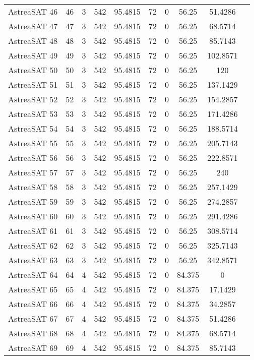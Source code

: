 \begin{longtable}{| c | c | c | c | c | c | c | c | c | c |}
AstreaSAT 46 & 46 & 3 & 542 & 95.4815 & 72 & 0 & 56.25 & 51.4286 \\ 
AstreaSAT 47 & 47 & 3 & 542 & 95.4815 & 72 & 0 & 56.25 & 68.5714 \\ 
AstreaSAT 48 & 48 & 3 & 542 & 95.4815 & 72 & 0 & 56.25 & 85.7143 \\ 
AstreaSAT 49 & 49 & 3 & 542 & 95.4815 & 72 & 0 & 56.25 & 102.8571 \\ 
AstreaSAT 50 & 50 & 3 & 542 & 95.4815 & 72 & 0 & 56.25 & 120 \\ 
AstreaSAT 51 & 51 & 3 & 542 & 95.4815 & 72 & 0 & 56.25 & 137.1429 \\ 
AstreaSAT 52 & 52 & 3 & 542 & 95.4815 & 72 & 0 & 56.25 & 154.2857 \\ 
AstreaSAT 53 & 53 & 3 & 542 & 95.4815 & 72 & 0 & 56.25 & 171.4286 \\ 
AstreaSAT 54 & 54 & 3 & 542 & 95.4815 & 72 & 0 & 56.25 & 188.5714 \\ 
AstreaSAT 55 & 55 & 3 & 542 & 95.4815 & 72 & 0 & 56.25 & 205.7143 \\ 
AstreaSAT 56 & 56 & 3 & 542 & 95.4815 & 72 & 0 & 56.25 & 222.8571 \\ 
AstreaSAT 57 & 57 & 3 & 542 & 95.4815 & 72 & 0 & 56.25 & 240 \\ 
AstreaSAT 58 & 58 & 3 & 542 & 95.4815 & 72 & 0 & 56.25 & 257.1429 \\ 
AstreaSAT 59 & 59 & 3 & 542 & 95.4815 & 72 & 0 & 56.25 & 274.2857 \\ 
AstreaSAT 60 & 60 & 3 & 542 & 95.4815 & 72 & 0 & 56.25 & 291.4286 \\ 
AstreaSAT 61 & 61 & 3 & 542 & 95.4815 & 72 & 0 & 56.25 & 308.5714 \\ 
AstreaSAT 62 & 62 & 3 & 542 & 95.4815 & 72 & 0 & 56.25 & 325.7143 \\ 
AstreaSAT 63 & 63 & 3 & 542 & 95.4815 & 72 & 0 & 56.25 & 342.8571 \\ 
AstreaSAT 64 & 64 & 4 & 542 & 95.4815 & 72 & 0 & 84.375 & 0 \\ 
AstreaSAT 65 & 65 & 4 & 542 & 95.4815 & 72 & 0 & 84.375 & 17.1429 \\ 
AstreaSAT 66 & 66 & 4 & 542 & 95.4815 & 72 & 0 & 84.375 & 34.2857 \\ 
AstreaSAT 67 & 67 & 4 & 542 & 95.4815 & 72 & 0 & 84.375 & 51.4286 \\ 
AstreaSAT 68 & 68 & 4 & 542 & 95.4815 & 72 & 0 & 84.375 & 68.5714 \\ 
AstreaSAT 69 & 69 & 4 & 542 & 95.4815 & 72 & 0 & 84.375 & 85.7143 \\ 

\end{longtable}
